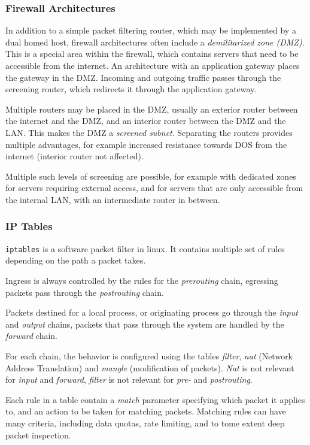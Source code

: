 \subsubsection{Firewall Architectures}
In addition to a simple packet filtering router, which may be implemented by a
dual homed host, firewall architectures often include a \emph{demilitarized zone
(DMZ)}. This is a special area within the firewall, which contains servers that
need to be accessible from the internet. An architecture with an application
gateway places the gateway in the DMZ. Incoming and outgoing traffic passes
through the screening router, which redirects it through the application
gateway.

Multiple routers may be placed in the DMZ, usually an exterior router between
the internet and the DMZ, and an interior router between the DMZ and the LAN.
This makes the DMZ a \textit{screened subnet}. Separating the routers provides
multiple advantages, for example increased resistance towards DOS from the
internet (interior router not affected).

Multiple such levels of screening are possible, for example with dedicated zones
for servers requiring external access, and for servers that are only accessible
from the internal LAN, with an intermediate router in between.

\subsubsection{IP Tables}
\texttt{iptables} is a software packet filter in linux. It contains multiple set
of rules depending on the path a packet takes.

Ingress is always controlled by the rules for the \textit{prerouting} chain,
egressing packets pass through the \textit{postrouting} chain.

Packets destined for a local process, or originating process go through the
\textit{input} and \textit{output} chains, packets that pass through the system
are handled by the \textit{forward} chain.

For each chain, the behavior is configured using the tables \textit{filter},
\textit{nat} (Network Address Translation) and \textit{mangle} (modification of
packets). \textit{Nat} is not relevant for \textit{input} and \textit{forward},
\textit{filter} is not relevant for \textit{pre-} and \textit{postrouting}.

Each rule in a table contain a \textit{match} parameter specifying which packet
it applies to, and an action to be taken for matching packets. Matching rules
can have many criteria, including data quotas, rate limiting, and to tome extent
deep packet inspection.

